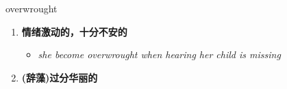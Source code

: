 
\begin{frame}
{\huge overwrought}
\begin{center}
\begin{enumerate}\Large
  \item \textbf{情绪激动的，十分不安的}
  \begin{itemize}
    \item \em{\Large{she become overwrought when hearing her child is missing}}
  \end{itemize}
  \item \textbf{(辞藻)过分华丽的}
\end{enumerate}
\end{center}
\end{frame}
